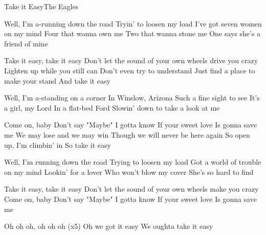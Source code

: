\documentclass[a4paper,11pt,french]{article}
\begin{document}
\begin{Song}{Take it Easy}{The Eagles}
\begin{multicols}{2}

\begin{Verse}
Well, I'm a-running down the road
Tryin' to loosen my load
I've got seven women on my mind
Four that wanna own me
Two that wanna stone me
One says she's a friend of mine
\end{Verse}
\espaceInterStrophe

\begin{Chorus}
Take it easy, take it easy
Don't let the sound of your own wheels drive you crazy
Lighten up while you still can
Don't even try to understand
Just find a place to make your stand
And take it easy
\end{Chorus}
\espaceInterStrophe

\begin{Verse}
Well, I'm a-standing on a corner
In Winslow, Arizona
Such a fine sight to see
It's a girl, my Lord
In a flat-bed Ford
Slowin' down to take a look at me
\vfill
\columnbreak
\end{Verse}
\espaceInterStrophe

\begin{Chorus}
Come on, baby
Don't say "Maybe"
I gotta know
If your sweet love
Is gonna save me
We may lose and we may win
Though we will never be here again
So open up, I'm climbin' in
So take it easy

\end{Chorus}
\espaceInterStrophe

\begin{Verse}
Well, I'm running down the road
Trying to loosen my load
Got a world of trouble on my mind
Lookin' for a lover
Who won't blow my cover
She's so hard to find
\end{Verse}
\espaceInterStrophe

\begin{Chorus}
Take it easy, take it easy
Don't let the sound of your own wheels make you crazy
Come on, baby
Don't say "Maybe"
I gotta know
If your sweet love
Is gonna save me
\end{Chorus}
\espaceInterStrophe

\begin{Chorus}
Oh oh oh, oh oh oh (x5)
Oh we got it easy
We oughta take it easy
\end{Chorus}

\end{multicols}

\vfill


\end{Song}
\end{document}
